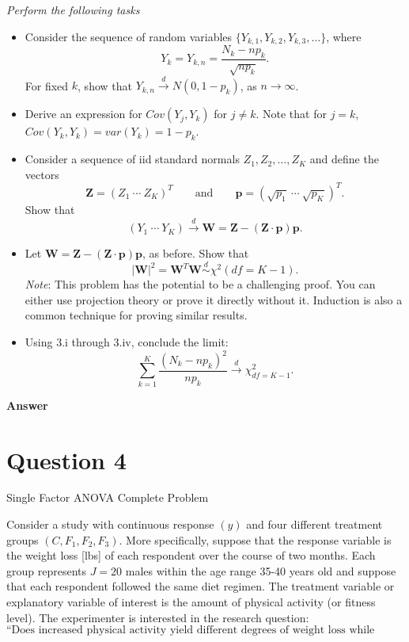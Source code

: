 \documentclass[letterpaper]{article}
\begin{document}
	\emph{Perform the following tasks}
	\begin{itemize}
		\item[(i)] Consider the sequence of random variables $\{Y_{k,1}, Y_{k,2}, Y_{k,3}, \ldots\}$, where
		\[
		Y_k = Y_{k,n} = \frac{N_k - np_k}{\sqrt{np_k}}.
		\]
		For fixed $k$, show that $Y_{k,n} \xrightarrow{d} N(0, 1 - p_k)$, as $n \to \infty$.
		
		\item[(ii)] Derive an expression for $Cov(Y_j, Y_k)$ for $j \neq k$. Note that for $j = k$, $Cov(Y_k, Y_k) = var(Y_k) = 1 - p_k$.
		
		\item[(iii)] Consider a sequence of iid standard normals $Z_1, Z_2, \ldots, Z_K$ and define the vectors
		\[
		\mathbf{Z} = (Z_1 \ \cdots \ Z_K)^T \qquad \text{and} \qquad \mathbf{p} = (\sqrt{p_1} \ \cdots \ \sqrt{p_K})^T.
		\]
		Show that
		\[
		(Y_1 \ \cdots \ Y_K) \xrightarrow{d} \mathbf{W} = \mathbf{Z} - (\mathbf{Z} \cdot \mathbf{p})\mathbf{p}.
		\]
		
		\item[(iv)] Let $\mathbf{W} = \mathbf{Z} - (\mathbf{Z} \cdot \mathbf{p})\mathbf{p}$, as before. Show that
		\[
		|\mathbf{W}|^2 = \mathbf{W}^T \mathbf{W} \overset{d}{\sim} \chi^2(df = K - 1).
		\]
		\emph{Note}: This problem has the potential to be a challenging proof. You can either use projection theory or prove it directly without it. Induction is also a common technique for proving similar results.
		
		\item[(v)] Using 3.i through 3.iv, conclude the limit:
		\[
		\sum_{k=1}^{K} \frac{(N_k - np_k)^2}{np_k} \xrightarrow{d} \chi^2_{df=K-1}.
		\]
	\end{itemize}
	
	\textbf{Answer}
	
	\clearpage
	
	\section{Question 4}
	
	{\color{deepred} Single Factor ANOVA Complete Problem}
	
	Consider a study with continuous response $(y)$ and four different treatment groups $(C,F_1,F_2,F_3)$. More specifically, suppose that the response variable is the weight loss [lbs] of each respondent over the course of two months. Each group represents $J=20$ males within the age range 35-40 years old and suppose that each respondent followed the same diet regimen. The treatment variable or explanatory variable of interest is the amount of physical activity (or fitness level). The experimenter is interested in the research question:
	\[
	\text{``Does increased physical activity yield different degrees of weight loss while dieting?''}
	\]
	
\end{document}
